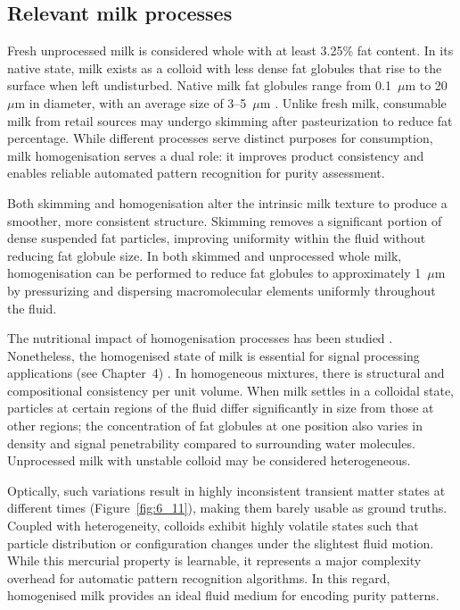 \documentclass[12pt,a4paper,oneside]{report}
\begin{document}
\subsection{Relevant milk processes}
\label{subsec:relevant_milk_processes}

Fresh unprocessed milk is considered whole with at least 3.25\% fat content. In its native state, milk exists as a colloid with less dense fat globules that rise to the surface when left undisturbed. Native milk fat globules range from 0.1~$\mu$m to 20~$\mu$m in diameter, with an average size of 3--5~$\mu$m \cite{walstra1999}. Unlike fresh milk, consumable milk from retail sources \cite{walstra1999} may undergo skimming after pasteurization to reduce fat percentage. While different processes serve distinct purposes for consumption, milk homogenisation serves a dual role: it improves product consistency and enables reliable automated pattern recognition for purity assessment.

Both skimming and homogenisation alter the intrinsic milk texture to produce a smoother, more consistent structure. Skimming removes a significant portion of dense suspended fat particles, improving uniformity within the fluid without reducing fat globule size. In both skimmed and unprocessed whole milk, homogenisation \cite{walstra1999,michalski2007} can be performed to reduce fat globules to approximately 1~$\mu$m by pressurizing and dispersing macromolecular elements uniformly throughout the fluid.

The nutritional impact of homogenisation processes has been studied \cite{michalski2007}. Nonetheless, the homogenised state of milk is essential \cite{aernouts2015,melfsen2012} for signal processing applications (see Chapter~4) \cite{chandra2024}. In homogeneous mixtures, there is structural and compositional consistency per unit volume. When milk settles in a colloidal state, particles at certain regions of the fluid differ significantly in size from those at other regions; the concentration of fat globules at one position also varies in density and signal penetrability compared to surrounding water molecules. Unprocessed milk with unstable colloid may be considered heterogeneous.

Optically, such variations result in highly inconsistent transient matter states at different times (Figure~\ref{fig:6_11}), making them barely usable as ground truths. Coupled with heterogeneity, colloids exhibit highly volatile states such that particle distribution or configuration changes under the slightest fluid motion. While this mercurial property is learnable, it represents a major complexity overhead for automatic pattern recognition algorithms. In this regard, homogenised milk provides an ideal fluid medium for encoding purity patterns.
\end{document}
